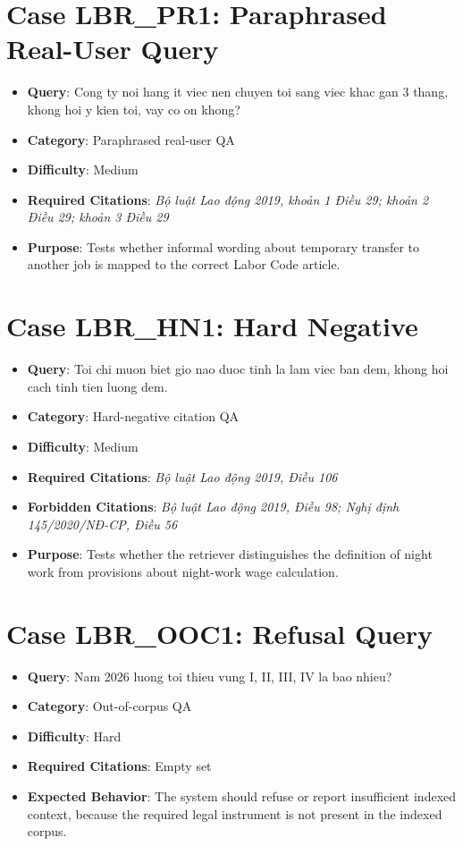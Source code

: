 \section{Case LBR\_PR1: Paraphrased Real-User Query}
\begin{itemize}
  \item \textbf{Query}: Cong ty noi hang it viec nen chuyen toi sang viec khac gan 3 thang, khong hoi y kien toi, vay co on khong?
  \item \textbf{Category}: Paraphrased real-user QA
  \item \textbf{Difficulty}: Medium
  \item \textbf{Required Citations}: \textit{Bộ luật Lao động 2019, khoản 1 Điều 29; khoản 2 Điều 29; khoản 3 Điều 29}
  \item \textbf{Purpose}: Tests whether informal wording about temporary transfer to another job is mapped to the correct Labor Code article.
\end{itemize}

\section{Case LBR\_HN1: Hard Negative}
\begin{itemize}
  \item \textbf{Query}: Toi chi muon biet gio nao duoc tinh la lam viec ban dem, khong hoi cach tinh tien luong dem.
  \item \textbf{Category}: Hard-negative citation QA
  \item \textbf{Difficulty}: Medium
  \item \textbf{Required Citations}: \textit{Bộ luật Lao động 2019, Điều 106}
  \item \textbf{Forbidden Citations}: \textit{Bộ luật Lao động 2019, Điều 98; Nghị định 145/2020/NĐ-CP, Điều 56}
  \item \textbf{Purpose}: Tests whether the retriever distinguishes the definition of night work from provisions about night-work wage calculation.
\end{itemize}

\section{Case LBR\_OOC1: Refusal Query}
\begin{itemize}
  \item \textbf{Query}: Nam 2026 luong toi thieu vung I, II, III, IV la bao nhieu?
  \item \textbf{Category}: Out-of-corpus QA
  \item \textbf{Difficulty}: Hard
  \item \textbf{Required Citations}: Empty set
  \item \textbf{Expected Behavior}: The system should refuse or report insufficient indexed context, because the required legal instrument is not present in the indexed corpus.
\end{itemize}

